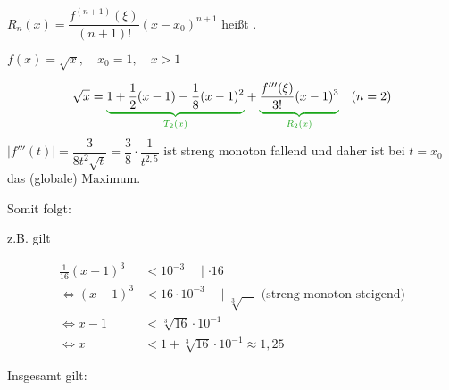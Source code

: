 $R_n(x)=\dfrac{f^{(n+1)}(\xi)}{(n+1)!}(x-x_0)^{n+1}$ heißt .


\Bsp $f(x)=\sqrt{x},\quad x_0=1,\quad x>1$

\begin{align*}
\sqrt{x}&=\greenunderbrace{1+\frac{1}{2}(x-1)-\frac{1}{8}(x-1)^2}{T_2(x)}+\greenunderbrace{\dfrac{f'''(\xi)}{3!}(x-1)^3}{R_2(x)}&(n=2)
\end{align*}
$|f'''(t)|=\dfrac{3}{8t^2\sqrt{t}}=\dfrac{3}{8}\cdot\dfrac{1}{t^{2{,}5}}$ ist streng monoton fallend
und daher ist bei $t=x_0$ das (globale) Maximum.

Somit folgt:

z.B. gilt

\begin{align*}
\frac{1}{16}(x-1)^3&<10^{-3}\quad\mid\cdot16\\
\Leftrightarrow(x-1)^3&<16\cdot10^{-3}\quad\mid\sqrt[3]{\quad}\text{ (streng monoton steigend)}\\
\Leftrightarrow x-1&<\sqrt[3]{16}\cdot10^{-1}\\
\Leftrightarrow x&<1+\sqrt[3]{16}\cdot10^{-1} \approx 1{,}25
\end{align*}

Insgesamt gilt:

